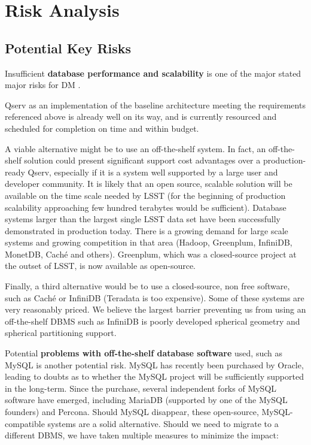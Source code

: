 \documentclass[DM,lsstdraft,toc]{lsstdoc}
\begin{document}
\section{Risk Analysis}\label{risk-analysis}

\subsection{Potential Key Risks}\label{potential-key-risks}

Insufficient \textbf{database performance and scalability} is one of the
major stated major risks for DM .

Qserv as an implementation of the baseline architecture meeting the
requirements referenced above is already well on its way, and is currently
resourced and scheduled for completion on time and within budget.

A viable alternative might be to use an off-the-shelf system. In fact, an off-the-shelf
solution could present significant support cost advantages over a
production-ready Qserv, especially if it is a system well supported by a large
user and developer community. It is likely that an open source, scalable
solution will be available on the time scale needed by LSST (for the beginning
of production scalability approaching few hundred terabytes would be
sufficient). Database systems larger than the largest single LSST data set
have been successfully demonstrated in production today.  There is a growing
demand for large scale systems and growing competition in that area (Hadoop,
Greenplum, InfiniDB, MonetDB, Caché and others).  Greenplum, which was a
closed-source project at the outset of LSST, is now available as open-source.

Finally, a third alternative would be to use a closed-source, non free
software, such as Caché or InfiniDB (Teradata is too expensive). Some of these
systems are very reasonably priced. We believe the largest barrier preventing
us from using an off-the-shelf DBMS such as InfiniDB is poorly developed
spherical geometry and spherical partitioning support.

Potential \textbf{problems with off-the-shelf database software} used,
such as MySQL is another potential risk. MySQL has recently been
purchased by Oracle, leading to doubts as to whether the MySQL project
will be sufficiently supported in the long-term. Since the purchase,
several independent forks of MySQL software have emerged, including
MariaDB (supported by one of the MySQL founders) and Percona. Should MySQL disappear, these open-source,
MySQL-compatible systems are a solid alternative. Should we need to
migrate to a different DBMS, we have taken multiple measures to minimize
the impact:
\end{document}

